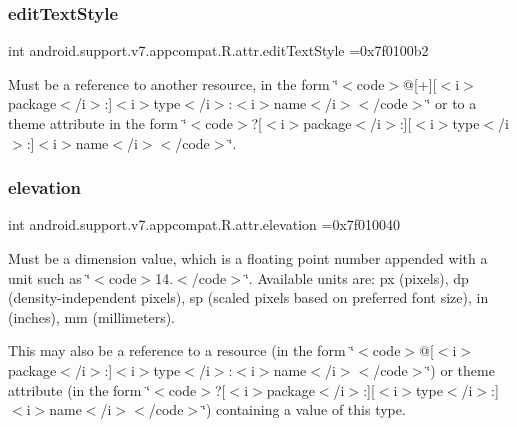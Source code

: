 \subsubsection{\texorpdfstring{edit\+Text\+Style}{editTextStyle}}
{\footnotesize\ttfamily int android.\+support.\+v7.\+appcompat.\+R.\+attr.\+edit\+Text\+Style =0x7f0100b2\hspace{0.3cm}{\ttfamily [static]}}

Must be a reference to another resource, in the form \char`\"{}$<$code$>$@\mbox{[}+\mbox{]}\mbox{[}$<$i$>$package$<$/i$>$\+:\mbox{]}$<$i$>$type$<$/i$>$\+:$<$i$>$name$<$/i$>$$<$/code$>$\char`\"{} or to a theme attribute in the form \char`\"{}$<$code$>$?\mbox{[}$<$i$>$package$<$/i$>$\+:\mbox{]}\mbox{[}$<$i$>$type$<$/i$>$\+:\mbox{]}$<$i$>$name$<$/i$>$$<$/code$>$\char`\"{}. \mbox{\label{classandroid_1_1support_1_1v7_1_1appcompat_1_1R_1_1attr_a4ad8a7d23ae4731f5836683e9cb7f790}} 
\subsubsection{\texorpdfstring{elevation}{elevation}}
{\footnotesize\ttfamily int android.\+support.\+v7.\+appcompat.\+R.\+attr.\+elevation =0x7f010040\hspace{0.3cm}{\ttfamily [static]}}

Must be a dimension value, which is a floating point number appended with a unit such as \char`\"{}$<$code$>$14.\+5sp$<$/code$>$\char`\"{}. Available units are\+: px (pixels), dp (density-\/independent pixels), sp (scaled pixels based on preferred font size), in (inches), mm (millimeters). 

This may also be a reference to a resource (in the form \char`\"{}$<$code$>$@\mbox{[}$<$i$>$package$<$/i$>$\+:\mbox{]}$<$i$>$type$<$/i$>$\+:$<$i$>$name$<$/i$>$$<$/code$>$\char`\"{}) or theme attribute (in the form \char`\"{}$<$code$>$?\mbox{[}$<$i$>$package$<$/i$>$\+:\mbox{]}\mbox{[}$<$i$>$type$<$/i$>$\+:\mbox{]}$<$i$>$name$<$/i$>$$<$/code$>$\char`\"{}) containing a value of this type. \mbox{\label{classandroid_1_1support_1_1v7_1_1appcompat_1_1R_1_1attr_a6b82c15fbb66c136709becccec25f526}} 
